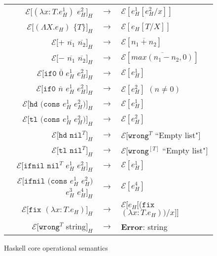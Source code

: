 \begin{figure}[p]
\centering
\begin{tabular}{rcl}
$\mathscr{E}[(\lambda x:T.e_{H}^{1})$ $e_{H}^{2}]_{H}$ & $\rightarrow$ & $\mathscr{E}[e_{H}^{1}[e_{H}^{2}/x]]$ \\
$\mathscr{E}[(\Lambda X.e_{H})$ $\lbrace T\rbrace]_{H}$ & $\rightarrow$ & $\mathscr{E}[e_{H}[T/X]]$ \\
$\mathscr{E}[+$ $\overline{n_{1}}$ $\overline{n_{2}}]_{H}$ & $\rightarrow$ & $\mathscr{E}[\overline{n_{1}+n_{2}}]$ \\
$\mathscr{E}[-$ $\overline{n_{1}}$ $\overline{n_{2}}]_{H}$ & $\rightarrow$ & $\mathscr{E}[\overline{max(n_{1}-n_{2},0)}]$ \\
$\mathscr{E}[\mathtt{if0}$ $\overline{0}$ $e_{H}^{1}$ $e_{H}^{2}]_{H}$ & $\rightarrow$ & $\mathscr{E}[e_{H}^{1}]$ \\
$\mathscr{E}[\mathtt{if0}$ $\overline{n}$ $e_{H}^{1}$ $e_{H}^{2}]_{H}$ & $\rightarrow$ & $\mathscr{E}[e_{H}^{2}]$ $(n\neq0)$ \\
$\mathscr{E}[\mathtt{hd}$ $(\mathtt{cons}$ $e_{H}^{1}$ $e_{H}^{2})]_{H}$ & $\rightarrow$ & $\mathscr{E}[e_{H}^{1}]$ \\
$\mathscr{E}[\mathtt{tl}$ $(\mathtt{cons}$ $e_{H}^{1}$ $e_{H}^{2})]_{H}$ & $\rightarrow$ & $\mathscr{E}[e_{H}^{2}]$ \\
$\mathscr{E}[\mathtt{hd}$ $\mathtt{nil}^{T}]_{H}$ & $\rightarrow$ & $\mathscr{E}[\mathtt{wrong}^{T}$ ``Empty list"$]$ \\
$\mathscr{E}[\mathtt{tl}$ $\mathtt{nil}^{T}]_{H}$ & $\rightarrow$ & $\mathscr{E}[\mathtt{wrong}^{[T]}$ ``Empty list"$]$ \\
$\mathscr{E}[\mathtt{ifnil}$ $\mathtt{nil}^{T}$ $e_{H}^{1}$ $e_{H}^{2}]_{H}$ & $\rightarrow$ & $\mathscr{E}[e_{H}^{1}]$ \\
$\mathscr{E}[\mathtt{ifnil}$ $(\mathtt{cons}$ $e_{H}^{1}$ $e_{H}^{2})$ $e_{H}^{3}$ $e_{H}^{4}]_{H}$ & $\rightarrow$ & $\mathscr{E}[e_{H}^{4}]$ \\
$\mathscr{E}[\mathtt{fix}$ $(\lambda x:T.e_{H})]_{H}$ & $\rightarrow$ & $\mathscr{E}[e_{H}[(\mathtt{fix}$ $(\lambda x:T.e_{H}))/x]]$ \\
$\mathscr{E}[\mathtt{wrong}^{T}$ string$]_{H}$ & $\rightarrow$ & \textbf{Error}: string
\end{tabular}
\caption{Haskell core operational semantics}
\label{hcos}
\end{figure}